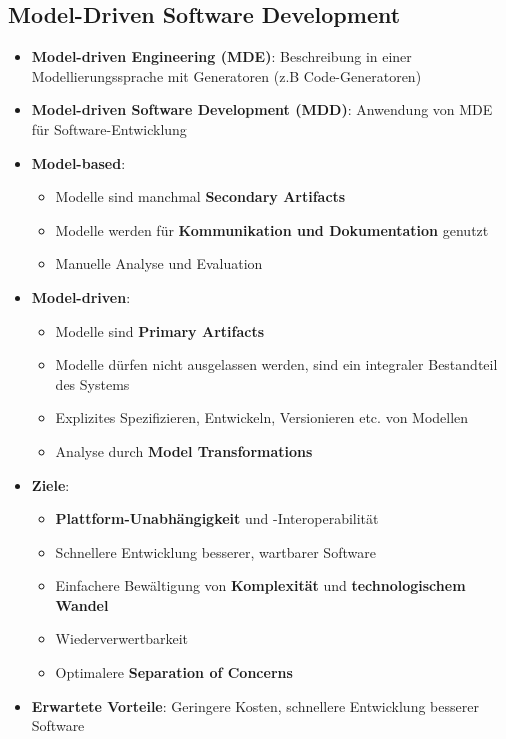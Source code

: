 \subsection{Model-Driven Software Development}
\label{mdd:sub:model_driven_software_development}

\begin{itemize}
	\item \textbf{Model-driven Engineering (MDE)}: Beschreibung in einer Modellierungssprache mit Generatoren (z.B Code-Generatoren)
	\item \textbf{Model-driven Software Development (MDD)}: Anwendung von MDE für Software-Entwicklung
	\item \textbf{Model-based}:
	\begin{itemize}
		\item Modelle sind manchmal \textbf{Secondary Artifacts}
		\item Modelle werden für \textbf{Kommunikation und Dokumentation} genutzt
		\item Manuelle Analyse und Evaluation
	\end{itemize}
	\item \textbf{Model-driven}:
	\begin{itemize}
		\item Modelle sind \textbf{Primary Artifacts}
		\item Modelle dürfen nicht ausgelassen werden, sind ein integraler Bestandteil des Systems
		\item Explizites Spezifizieren, Entwickeln, Versionieren etc. von Modellen
		\item Analyse durch \textbf{Model Transformations}
	\end{itemize}
	\item \textbf{Ziele}:
	\begin{itemize}
		\item \textbf{Plattform-Unabhängigkeit} und -Interoperabilität
		\item Schnellere Entwicklung besserer, wartbarer Software
		\item Einfachere Bewältigung von \textbf{Komplexität} und \textbf{technologischem Wandel}
		\item Wiederverwertbarkeit
		\item Optimalere \textbf{Separation of Concerns}
	\end{itemize}
	\item \textbf{Erwartete Vorteile}: Geringere Kosten, schnellere Entwicklung besserer Software
\end{itemize}

